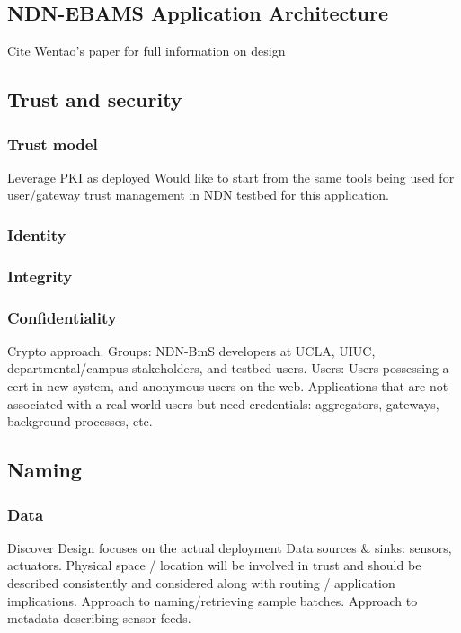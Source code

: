 \subsection{NDN-EBAMS Application Architecture} 
 
Cite Wentao's paper for full information on design

  
 \subsection{Trust and security}
\subsubsection{Trust model} 
Leverage PKI as deployed
Would like to start from the same tools being used for user/gateway trust management in NDN testbed for this application.  

\subsubsection{Identity} 

\subsubsection{Integrity} 

\subsubsection{Confidentiality}
Crypto approach.
Groups: NDN-BmS developers at UCLA, UIUC, departmental/campus stakeholders, and testbed users. 
Users:  Users possessing a cert in new system, and anonymous users on the web.
Applications that are not associated with a real-world users but need credentials: aggregators, gateways, background processes, etc. 



\subsection{Naming}
\subsubsection{Data}

Discover
Design focuses on the actual deployment
Data sources \& sinks:  sensors, actuators.
Physical space / location will be involved in trust and should be described consistently and considered along with routing / application implications.
Approach to naming/retrieving sample batches. 
Approach to metadata describing sensor feeds. 

